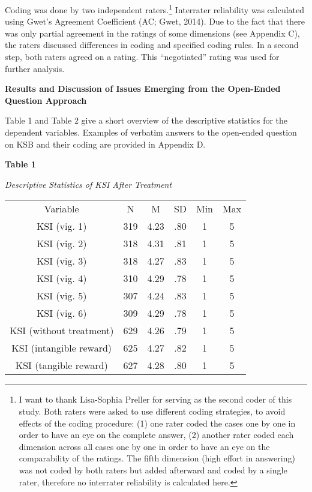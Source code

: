 \documentclass{article}
\begin{document}
Coding was done by two independent raters.\footnote{I want to thank Lisa-Sophia Preller for serving as the second coder of this study. Both raters were asked to use different coding strategies, to avoid effects of the coding procedure: (1) one rater coded the cases one by one in order to have an eye on the complete answer, (2) another rater coded each dimension across all cases one by one in order to have an eye on the comparability of the ratings. The fifth dimension (high effort in answering) was not coded by both raters but added afterward and coded by a single rater, therefore no interrater reliability is calculated here.} Interrater reliability was calculated using Gwet's Agreement Coefficient (AC; Gwet, 2014). Due to the fact that there was only partial agreement in the ratings of some dimensions (see Appendix C), the raters discussed differences in coding and specified coding rules. In a second step, both raters agreed on a rating. This “negotiated” rating was used for further analysis.



\textbf{Results and Discussion of Issues Emerging from the Open-Ended Question Approach}

Table 1 and Table 2 give a short overview of the descriptive statistics for the dependent variables. Examples of verbatim answers to the open-ended question on KSB and their coding are provided in Appendix D.

\textbf{Table 1}

\emph{Descriptive Statistics of KSI After Treatment}


\begin{table}

  
\begin{tabular}{c  c  c  c  c  c}

  Variable & N & M & SD & Min & Max\\
KSI (vig. 1) & 319 & 4.23 & .80 & 1 & 5\\
KSI (vig. 2) & 318 & 4.31 & .81 & 1 & 5\\
KSI (vig. 3) & 318 & 4.27 & .83 & 1 & 5\\
KSI (vig. 4) & 310 & 4.29 & .78 & 1 & 5\\
KSI (vig. 5) & 307 & 4.24 & .83 & 1 & 5\\
KSI (vig. 6) & 309 & 4.29 & .78 & 1 & 5\\
KSI (without treatment) & 629 & 4.26 & .79 & 1 & 5\\
KSI (intangible reward) & 625 & 4.27 & .82 & 1 & 5\\
KSI (tangible reward) & 627 & 4.28 & .80 & 1 & 5\\


\end{tabular}


\end{table}
\end{document}
